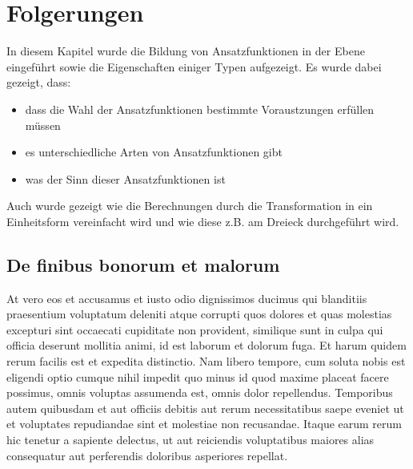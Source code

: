 %
%
%
\section{Folgerungen
\label{fem:section:folgerungen}}
In diesem Kapitel wurde die Bildung von Ansatzfunktionen in der Ebene eingeführt sowie die Eigenschaften einiger Typen aufgezeigt. Es wurde dabei gezeigt, dass:
\begin{itemize}
	\item dass die Wahl der Ansatzfunktionen bestimmte Voraustzungen erfüllen müssen
	\item es unterschiedliche Arten von Ansatzfunktionen gibt
	\item was der Sinn dieser Ansatzfunktionen ist
\end{itemize}
Auch wurde gezeigt wie die Berechnungen durch die Transformation in ein Einheitsform vereinfacht wird und wie diese z.B. am Dreieck durchgeführt wird.


\subsection{De finibus bonorum et malorum
\label{fem:subsection:malorum}}
At vero eos et accusamus et iusto odio dignissimos ducimus qui
blanditiis praesentium voluptatum deleniti atque corrupti quos
dolores et quas molestias excepturi sint occaecati cupiditate non
provident, similique sunt in culpa qui officia deserunt mollitia
animi, id est laborum et dolorum fuga. Et harum quidem rerum facilis
est et expedita distinctio. Nam libero tempore, cum soluta nobis
est eligendi optio cumque nihil impedit quo minus id quod maxime
placeat facere possimus, omnis voluptas assumenda est, omnis dolor
repellendus. Temporibus autem quibusdam et aut officiis debitis aut
rerum necessitatibus saepe eveniet ut et voluptates repudiandae
sint et molestiae non recusandae. Itaque earum rerum hic tenetur a
sapiente delectus, ut aut reiciendis voluptatibus maiores alias
consequatur aut perferendis doloribus asperiores repellat.


